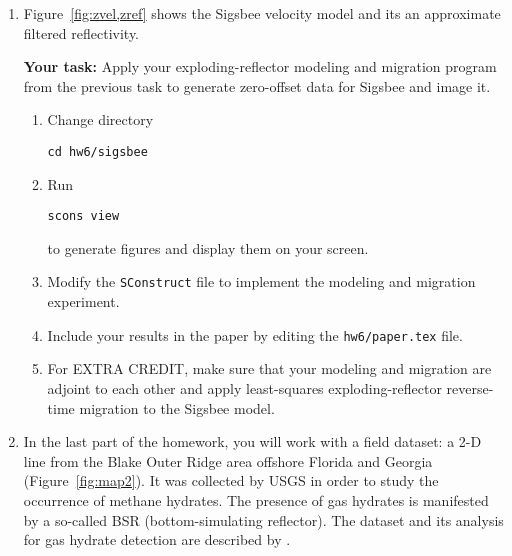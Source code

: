\begin{enumerate}
\lstset{language=python,numbers=left,numberstyle=\tiny,showstringspaces=false}


\lstset{language=c,numbers=left,numberstyle=\tiny,showstringspaces=false}


\item Figure~\ref{fig:zvel,zref} shows the Sigsbee velocity model \cite[]{SEG-2002-21222125} and its an approximate filtered reflectivity. 



  \textbf{Your task:} Apply your exploding-reflector modeling and migration program from the previous task to generate zero-offset data for Sigsbee and image it.

    \begin{enumerate}
    \item Change directory 
\begin{verbatim}
cd hw6/sigsbee
\end{verbatim}
    \item Run
\begin{verbatim}
scons view
\end{verbatim}
      to generate figures and display them on your screen.  
    \item Modify the \texttt{SConstruct} file to implement the modeling and migration experiment.
    \item Include your results in the paper by editing the \texttt{hw6/paper.tex} file.
\item For EXTRA CREDIT, make sure that your modeling and migration are adjoint to each other and apply least-squares exploding-reflector reverse-time migration to the Sigsbee model. 
    \end{enumerate}

\lstset{language=python,numbers=left,numberstyle=\tiny,showstringspaces=false}



\item In the last part of the homework, 
  you will work with a field dataset: a 2-D line
  from the Blake Outer Ridge area offshore Florida and Georgia
  (Figure~\ref{fig:map2}). It was collected by USGS in order to study
  the occurrence of methane hydrates. The presence of gas hydrates is
  manifested by a so-called BSR (bottom-simulating reflector).  The
  dataset and its analysis for gas hydrate detection are described by
  \cite{GEO63-05-16591669,GEO65-02-05650573}.


\end{enumerate}
